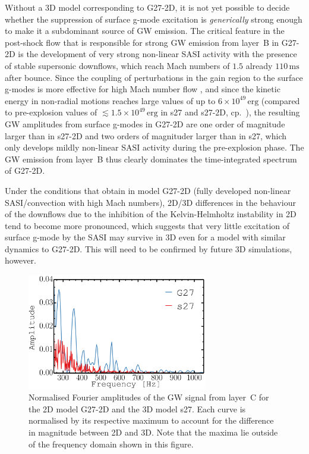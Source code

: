 {Without a 3D model corresponding to G27-2D, it is not yet
  possible to decide whether the suppression of surface g-mode
  excitation is \emph{generically} strong enough to make it a
  subdominant source of GW emission. The critical feature in the
  post-shock flow that is responsible for strong GW emission from
  layer~B in G27-2D is the development of very strong non-linear SASI
  activity with the presence of stable supersonic downflows, which
  reach Mach numbers of $1.5$ already $110 \, \mathrm{ms}$ after
  bounce. Since the coupling of perturbations in the gain region to
  the surface g-modes is more effective for high Mach number flow
  \citep[cp.][]{goldreich_90,lecoanet_12}, and since the kinetic
  energy in non-radial motions reaches large values of up to $6 \times
  10^{49} \, \mathrm{erg}$ (compared to pre-explosion values of
  $\mathord{\lesssim 1.5} \times 10^{49} \, \mathrm{erg}$ in s27
and s27-2D,
  cp.\ \citealp{hanke_13}), the resulting GW amplitudes from surface
  g-modes in G27-2D are one order of magnitude larger  than in s27-2D
and two orders of magnituder larger than in s27, which only
  develops mildly non-linear SASI activity during the pre-explosion
  phase. The GW emission from layer~B thus clearly dominates the
  time-integrated spectrum of G27-2D.

 Under the conditions that obtain in model G27-2D (fully
  developed non-linear SASI/convection with high Mach numbers), 2D/3D
  differences in the behaviour of the downflows due to the inhibition
  of the Kelvin-Helmholtz instability in 2D tend to become more
  pronounced, which suggests that very little excitation of surface
  g-mode by the SASI may survive in 3D even for a model with similar
  dynamics to G27-2D.  This will need to be confirmed by future 3D
  simulations, however.  }




\begin{figure}
\centering
\includegraphics[width=0.7\textwidth]{./images/paper1/fig10.pdf}
\caption{Normalised Fourier amplitudes of the GW signal from layer~C
for the 2D model G27-2D and the 3D model s27. Each curve is normalised by its respective maximum to account for
the difference in magnitude between 2D and 3D. Note that the maxima lie outside of the frequency domain shown in this figure.
\label{fig:post3v2}}
\end{figure}

